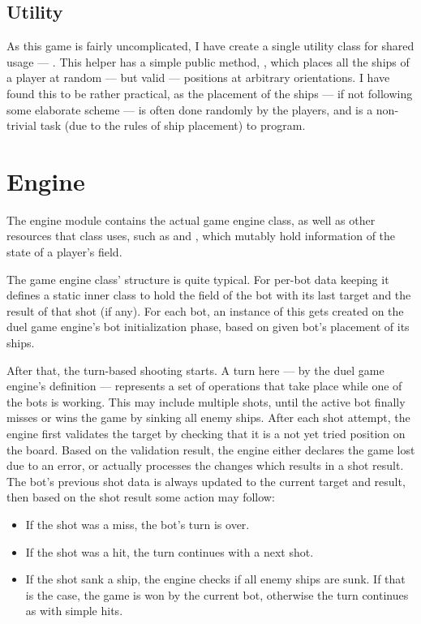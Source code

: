 			\subsection{Utility}
			
			As this game is fairly uncomplicated, I have create a single utility class for shared usage --- . This helper has a simple public method, , which places all the ships of a player at random --- but valid --- positions at arbitrary orientations. I have found this to be rather practical, as the placement of the ships --- if not following some elaborate scheme --- is often done randomly by the players, and is a non-trivial task (due to the rules of ship placement) to program.
		
		\section{Engine}		

		The engine module contains the actual game engine class, as well as other resources that class uses, such as  and , which mutably hold information of the state of a player's field.

		The game engine class' structure is quite typical. For per-bot data keeping it defines a static inner class to hold the field of the bot with its last target and the result of that shot (if any). For each bot, an instance of this gets created on the duel game engine's bot initialization phase, based on given bot's placement of its ships.
		
		After that, the turn-based shooting starts. A turn here --- by the duel game engine's definition --- represents a set of operations that take place while one of the bots is working. This may include multiple shots, until the active bot finally misses or wins the game by sinking all enemy ships. After each shot attempt, the engine first validates the target by checking that it is a not yet tried position on the board. Based on the validation result, the engine either declares the game lost due to an error, or actually processes the changes which results in a shot result. The bot's previous shot data is always updated to the current target and result, then based on the shot result some action may follow: 
		
		\begin{itemize}
		
			\item If the shot was a miss, the bot's turn is over.
			
			\item If the shot was a hit, the turn continues with a next shot.
			
			\item If the shot sank a ship, the engine checks if all enemy ships are sunk. If that is the case, the game is won by the current bot, otherwise the turn continues as with simple hits.
		
		\end{itemize}

